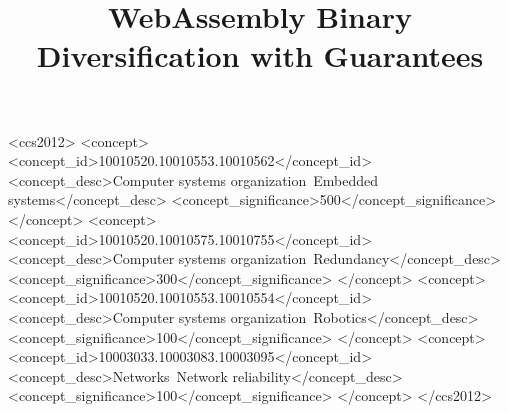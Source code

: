 \documentclass[sigplan,screen]{acmart}
\begin{document}
\title{WebAssembly Binary Diversification with Guarantees}



\begin{abstract}
  
\end{abstract}

\begin{CCSXML}
<ccs2012>
 <concept>
  <concept_id>10010520.10010553.10010562</concept_id>
  <concept_desc>Computer systems organization~Embedded systems</concept_desc>
  <concept_significance>500</concept_significance>
 </concept>
 <concept>
  <concept_id>10010520.10010575.10010755</concept_id>
  <concept_desc>Computer systems organization~Redundancy</concept_desc>
  <concept_significance>300</concept_significance>
 </concept>
 <concept>
  <concept_id>10010520.10010553.10010554</concept_id>
  <concept_desc>Computer systems organization~Robotics</concept_desc>
  <concept_significance>100</concept_significance>
 </concept>
 <concept>
  <concept_id>10003033.10003083.10003095</concept_id>
  <concept_desc>Networks~Network reliability</concept_desc>
  <concept_significance>100</concept_significance>
 </concept>
</ccs2012>
\end{CCSXML}



\end{document}
